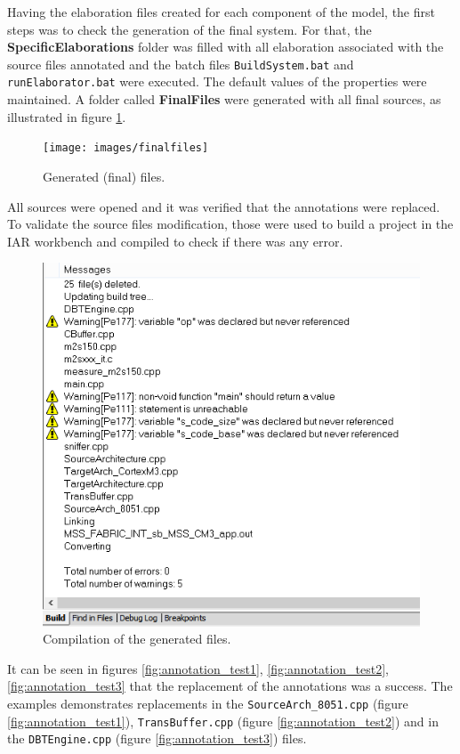 \documentclass[12pt]{article}
\begin{document}
{Having the elaboration files created for each component of the model, the first steps was to check the generation of the final system. For that, the \textbf{SpecificElaborations} folder was filled with all elaboration associated with the source files annotated and the batch files \texttt{BuildSystem.bat} and \texttt{runElaborator.bat} were executed. The default values of the properties were maintained. A folder called \textbf{FinalFiles} were generated with all final sources, as illustrated in figure \ref{fig:final_files}.


\begin{figure}[H]
\centerline{
\texttt{[image: images/finalfiles]}
}
\caption{Generated (final) files.}
\label{fig:final_files}
\end{figure}

All sources were opened and it was verified that the annotations were replaced. To validate the source files modification, those were used to build a project in the IAR workbench and compiled to check if there was any error.

\begin{figure}[H]
\centerline{
\includegraphics[scale=0.5]{images/compilar}
}
\caption{Compilation of the generated files.}
\label{fig:final_files2}
\end{figure}

It can be seen in figures \ref{fig:annotation_test1}, \ref{fig:annotation_test2}, \ref{fig:annotation_test3} that the replacement of the annotations was  a success. The examples demonstrates replacements in the \texttt{SourceArch\_8051.cpp} (figure \ref{fig:annotation_test1}), \texttt{TransBuffer.cpp} (figure \ref{fig:annotation_test2}) and in the \texttt{DBTEngine.cpp} (figure \ref{fig:annotation_test3}) files.

}
\end{document}
